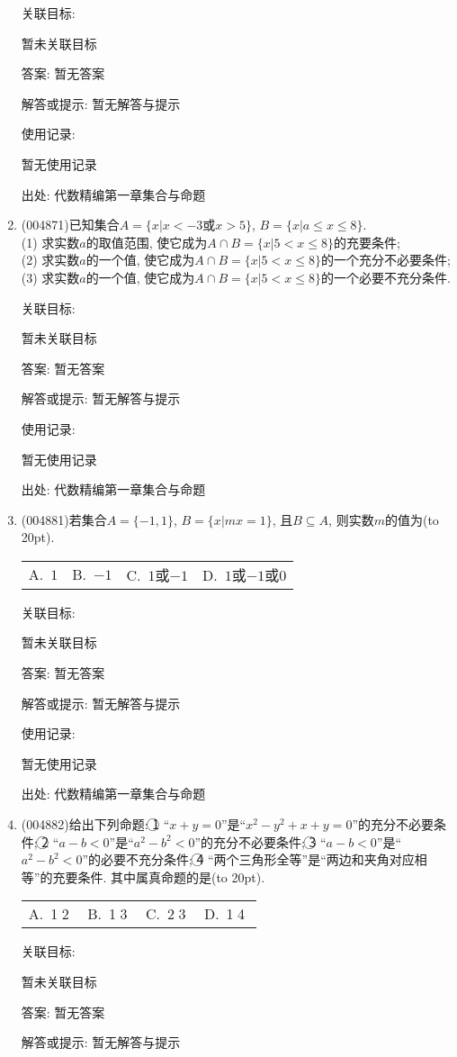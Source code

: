 \documentclass[10pt,a4paper]{article}
\newcommand{\bracket}[1]{(\hbox to #1pt{})}
\newcommand{\fourch}[4]{\par\begin{tabular}{p{.23\textwidth}p{.23\textwidth}p{.23\textwidth}p{.23\textwidth}}
A.~#1 &B.~#2& C.~#3& D.~#4
\end{tabular}}
\begin{document}
\begin{enumerate}[1.]
关联目标:

暂未关联目标

答案: 暂无答案

解答或提示: 暂无解答与提示

使用记录:

暂无使用记录


出处: 代数精编第一章集合与命题
\item { (004871)}已知集合$A=\{x|x<-3\text{或}x>5\}$, $B=\{x|a\le x\le 8\}$.\\
(1) 求实数$a$的取值范围, 使它成为$A\cap B=\{x|5<x\le 8\}$的充要条件;\\
(2) 求实数$a$的一个值, 使它成为$A\cap B=\{x|5<x\le 8\}$的一个充分不必要条件;\\
(3) 求实数$a$的一个值, 使它成为$A\cap B=\{x|5<x\le 8\}$的一个必要不充分条件.


关联目标:

暂未关联目标

答案: 暂无答案

解答或提示: 暂无解答与提示

使用记录:

暂无使用记录


出处: 代数精编第一章集合与命题
\item { (004881)}若集合$A=\{-1,1\}$, $B=\{x|mx=1\}$, 且$B\subseteq A$, 则实数$m$的值为\bracket{20}.
\fourch{$1$}{$-1$}{$1$或$-1$}{$1$或$-1$或$0$}


关联目标:

暂未关联目标

答案: 暂无答案

解答或提示: 暂无解答与提示

使用记录:

暂无使用记录


出处: 代数精编第一章集合与命题
\item { (004882)}给出下列命题: \textcircled{1} ``$x+y=0$''是``$x^2-y^2+x+y=0$''的充分不必要条件; \textcircled{2} ``$a-b<0$''是``$a^2-b^2<0$''的充分不必要条件; \textcircled{3} ``$a-b<0$''是``$a^2-b^2<0$''的必要不充分条件; \textcircled{4} ``两个三角形全等''是``两边和夹角对应相等''的充要条件.
其中属真命题的是\bracket{20}.
\fourch{\textcircled{1}\textcircled{2}}{\textcircled{1}\textcircled{3}}{\textcircled{2}\textcircled{3}}{\textcircled{1}\textcircled{4}}


关联目标:

暂未关联目标

答案: 暂无答案

解答或提示: 暂无解答与提示


\end{enumerate}
\end{document}
